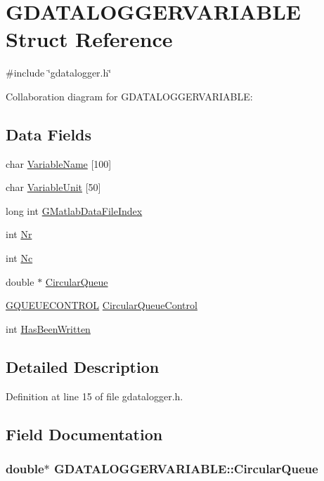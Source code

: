 \hypertarget{structGDATALOGGERVARIABLE}{
\section{GDATALOGGERVARIABLE Struct Reference}
\label{structGDATALOGGERVARIABLE}
}


{\ttfamily \#include \char`\"{}gdatalogger.h\char`\"{}}



Collaboration diagram for GDATALOGGERVARIABLE:\subsection*{Data Fields}
\begin{DoxyCompactItemize}
\item 
char \hyperlink{structGDATALOGGERVARIABLE_a336b7b6cbfc9cdebc7e1ade3de17ac3f}{VariableName} \mbox{[}100\mbox{]}
\item 
char \hyperlink{structGDATALOGGERVARIABLE_a0d42da63f3f904774cbf2ee8d92ee135}{VariableUnit} \mbox{[}50\mbox{]}
\item 
long int \hyperlink{structGDATALOGGERVARIABLE_aa1cd5b838d8655734e7d4499b25bf22a}{GMatlabDataFileIndex}
\item 
int \hyperlink{structGDATALOGGERVARIABLE_a68c3eb0f57a786afe9a2658fc42b61d6}{Nr}
\item 
int \hyperlink{structGDATALOGGERVARIABLE_abd1db7599f09e121cd125e665cb9c460}{Nc}
\item 
double $\ast$ \hyperlink{structGDATALOGGERVARIABLE_ae17ad02442f31da9518c99ce13607c8b}{CircularQueue}
\item 
\hyperlink{structGQUEUECONTROL}{GQUEUECONTROL} \hyperlink{structGDATALOGGERVARIABLE_a1a50747d2223f228288b4656470d9bbc}{CircularQueueControl}
\item 
int \hyperlink{structGDATALOGGERVARIABLE_ad982aef10e8496c2a1c6b9bb1f1dc5c3}{HasBeenWritten}
\end{DoxyCompactItemize}


\subsection{Detailed Description}


Definition at line 15 of file gdatalogger.h.



\subsection{Field Documentation}
\hypertarget{structGDATALOGGERVARIABLE_ae17ad02442f31da9518c99ce13607c8b}{
\subsubsection[{CircularQueue}]{\setlength{\rightskip}{0pt plus 5cm}double$\ast$ {\bf GDATALOGGERVARIABLE::CircularQueue}}}
\label{structGDATALOGGERVARIABLE_ae17ad02442f31da9518c99ce13607c8b}


